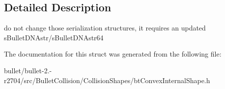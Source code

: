 \subsection{Detailed Description}
do not change those serialization structures, it requires an updated s\+Bullet\+D\+N\+Astr/s\+Bullet\+D\+N\+Astr64 

The documentation for this struct was generated from the following file\+:\begin{DoxyCompactItemize}
\item 
bullet/bullet-\/2.-\/r2704/src/\+Bullet\+Collision/\+Collision\+Shapes/bt\+Convex\+Internal\+Shape.\+h\end{DoxyCompactItemize}
